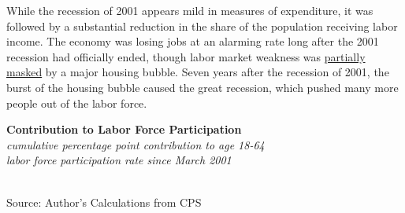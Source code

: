 \documentclass{report}
\makeatletter
\newcommand{\tbllink}[1]{\href{https://raw.githubusercontent.com/bdecon/US-chartbook/master/chartbook/data/#1}{\faTable}}
\newcommand*\short[1]{\expandafter\@gobbletwo\number\numexpr#1\relax}
\newcommand{\stdnode}[3]{\node[below, align=left, shift=({#1,#2})]{#3};}
\newcommand{\dateaxisticks}{
		date coordinates in=x, axis line style={draw=none},
		xmax={2020-05-10},
		max space between ticks=40,	    
		xtick={{1990-01-01}, {1992-01-01}, {1994-01-01}, 
			{1996-01-01}, {1998-01-01}, {2000-01-01}, 
			{2002-01-01}, {2004-01-01}, {2006-01-01},
			{2008-01-01}, {2010-01-01}, {2012-01-01}, {2014-01-01},
		    {2016-01-01}, {2018-01-01}, {2020-01-01}},
		minor xtick={{1989-01-01}, {1991-01-01}, {1993-01-01},
			{1995-01-01}, {1997-01-01}, {1999-01-01}, 
			{2001-01-01}, {2003-01-01}, {2005-01-01}, {2007-01-01},
		    {2009-01-01}, {2011-01-01}, {2013-01-01}, {2015-01-01},
		    {2017-01-01}, {2019-01-01}},
		enlarge y limits={0.06}, enlarge x limits={0.01},
		}
\newcommand{\bbar}[2]{extra #1 ticks = {{#2}}, extra #1 tick labels = ,
		extra #1 tick style = {grid=major, grid style={thick, black!25}},}
\newcommand{\stdline}[4]{\addplot[very thick, no markers, color=#1] 
		table [x=#2, y=#3, col sep=comma] {#4};	}
\newcommand{\thickline}[4]{\addplot[ultra thick, no markers, color=#1] 
		table [x=#2, y=#3, col sep=comma] {#4};	}
\newcommand{\rebars}{
		\fill[color=black!10] (axis cs:{2007-12-01},\pgfkeysvalueof{/pgfplots/ymin}) rectangle 
			(axis cs:{2009-07-01}, \pgfkeysvalueof{/pgfplots/ymax});
		\fill[color=black!10] (axis cs:{2001-03-01},\pgfkeysvalueof{/pgfplots/ymin}) rectangle 
			(axis cs:{2001-11-01}, \pgfkeysvalueof{/pgfplots/ymax});}
\makeatother
\begin{document}
{{{{{{{{{\begin{minipage}{0.76\textwidth}
\small While the recession of 2001 appears mild in measures of expenditure, it was followed by a substantial reduction in the share of the population receiving labor income. The economy was losing jobs at an alarming rate long after the 2001 recession had officially ended, though labor market weakness was \href{https://www.aeaweb.org/articles?id=10.1257/jep.30.2.179}{partially masked} by a major housing bubble. Seven years after the recession of 2001, the burst of the housing bubble caused the great recession, which pushed many more people out of the labor force.
\end{minipage}

\vspace{1.5mm}

\begin{minipage}{0.3\textwidth}
\small  
\end{minipage} \hspace{7mm}
\begin{minipage}{0.42\textwidth}
\noindent \normalsize \textbf{Contribution to Labor Force Participation}\\
\footnotesize{\textit{cumulative percentage point contribution to age 18-64}}\\ 
\footnotesize{\textit{labor force participation rate since March 2001}}\\ 
\noindent \hspace*{-3mm} \\
\footnotesize{Source: Author's Calculations from CPS} \hspace{12mm} \tbllink{nilf.csv}\\


\end{minipage}}}}}}}}}}
\end{document}

